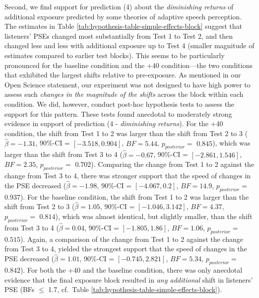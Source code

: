 \documentclass[
  11pt,
  man,mask,floatsintext]{apa6}
\begin{document}
Second, we find support for prediction (4) about the \emph{diminishing returns} of additional exposure predicted by some theories of adaptive speech perception. The estimates in Table \ref{tab:hypothesis-table-simple-effects-block} suggest that listeners' PSEs changed most substantially from Test 1 to Test 2, and then changed less and less with additional exposure up to Test 4 (smaller magnitude of estimates compared to earlier test blocks). This seems to be particularly pronounced for the baseline condition and the +40 condition---the two conditions that exhibited the largest shifts relative to pre-exposure. As mentioned in our Open Science statement, our experiment was not designed to have high power to assess such \emph{changes in the magnitude of the shifts} across the block within each condition. We did, however, conduct post-hoc hypothesis tests to assess the support for this pattern. These tests found anecdotal to moderately strong evidence in support of prediction (4 - \emph{diminishing returns}). For the +40 condition, the shift from Test 1 to 2 was larger than the shift from Test 2 to 3 (\(\hat{\beta} = -1.31\), 90\%-CI = \([-3.518, 0.904]\), \(BF = 5.44\), \(p_{posterior} =\) \(0.845\)), which was larger than the shift from Test 3 to 4 (\(\hat{\beta} = -0.67\), 90\%-CI = \([-2.861, 1.546]\), \(BF = 2.35\), \(p_{posterior} =\) \(0.702\)). Comparing the change from Test 1 to 2 against the change from Test 3 to 4, there was stronger support that the speed of changes in the PSE decreased (\(\hat{\beta} = -1.98\), 90\%-CI = \([-4.067, 0.2]\), \(BF = 14.9\), \(p_{posterior} =\) \(0.937\)). For the baseline condition, the shift from Test 1 to 2 was larger than the shift from Test 2 to 3 (\(\hat{\beta} = 1.05\), 90\%-CI = \([-1.046, 3.142]\), \(BF = 4.37\), \(p_{posterior} =\) \(0.814\)), which was almost identical, but slightly smaller, than the shift from Test 3 to 4 (\(\hat{\beta} = 0.04\), 90\%-CI = \([-1.805, 1.86]\), \(BF = 1.06\), \(p_{posterior} =\) \(0.515\)). Again, a comparison of the change from Test 1 to 2 against the change from Test 3 to 4, yielded the strongest support that the speed of changes in the PSE decreased (\(\hat{\beta} = 1.01\), 90\%-CI = \([-0.745, 2.821]\), \(BF = 5.34\), \(p_{posterior} =\) \(0.842\)). For both the +40 and the baseline condition, there was only anecdotal evidence that the final exposure block resulted in \emph{any additional} shift in listeners' PSE (BFs \(\leq\) 1.7, cf.~Table \ref{tab:hypothesis-table-simple-effects-block}).
\end{document}
